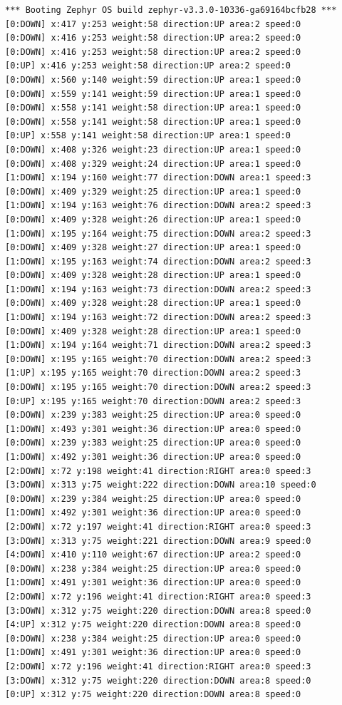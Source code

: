 \documentclass[11pt,a4paper,oneside]{article}
\begin{document}
\begin{lstlisting}
*** Booting Zephyr OS build zephyr-v3.3.0-10336-ga69164bcfb28 ***
[0:DOWN] x:417 y:253 weight:58 direction:UP area:2 speed:0
[0:DOWN] x:416 y:253 weight:58 direction:UP area:2 speed:0
[0:DOWN] x:416 y:253 weight:58 direction:UP area:2 speed:0
[0:UP] x:416 y:253 weight:58 direction:UP area:2 speed:0
[0:DOWN] x:560 y:140 weight:59 direction:UP area:1 speed:0
[0:DOWN] x:559 y:141 weight:59 direction:UP area:1 speed:0
[0:DOWN] x:558 y:141 weight:58 direction:UP area:1 speed:0
[0:DOWN] x:558 y:141 weight:58 direction:UP area:1 speed:0
[0:UP] x:558 y:141 weight:58 direction:UP area:1 speed:0
[0:DOWN] x:408 y:326 weight:23 direction:UP area:1 speed:0
[0:DOWN] x:408 y:329 weight:24 direction:UP area:1 speed:0
[1:DOWN] x:194 y:160 weight:77 direction:DOWN area:1 speed:3
[0:DOWN] x:409 y:329 weight:25 direction:UP area:1 speed:0
[1:DOWN] x:194 y:163 weight:76 direction:DOWN area:2 speed:3
[0:DOWN] x:409 y:328 weight:26 direction:UP area:1 speed:0
[1:DOWN] x:195 y:164 weight:75 direction:DOWN area:2 speed:3
[0:DOWN] x:409 y:328 weight:27 direction:UP area:1 speed:0
[1:DOWN] x:195 y:163 weight:74 direction:DOWN area:2 speed:3
[0:DOWN] x:409 y:328 weight:28 direction:UP area:1 speed:0
[1:DOWN] x:194 y:163 weight:73 direction:DOWN area:2 speed:3
[0:DOWN] x:409 y:328 weight:28 direction:UP area:1 speed:0
[1:DOWN] x:194 y:163 weight:72 direction:DOWN area:2 speed:3
[0:DOWN] x:409 y:328 weight:28 direction:UP area:1 speed:0
[1:DOWN] x:194 y:164 weight:71 direction:DOWN area:2 speed:3
[0:DOWN] x:195 y:165 weight:70 direction:DOWN area:2 speed:3
[1:UP] x:195 y:165 weight:70 direction:DOWN area:2 speed:3
[0:DOWN] x:195 y:165 weight:70 direction:DOWN area:2 speed:3
[0:UP] x:195 y:165 weight:70 direction:DOWN area:2 speed:3
[0:DOWN] x:239 y:383 weight:25 direction:UP area:0 speed:0
[1:DOWN] x:493 y:301 weight:36 direction:UP area:0 speed:0
[0:DOWN] x:239 y:383 weight:25 direction:UP area:0 speed:0
[1:DOWN] x:492 y:301 weight:36 direction:UP area:0 speed:0
[2:DOWN] x:72 y:198 weight:41 direction:RIGHT area:0 speed:3
[3:DOWN] x:313 y:75 weight:222 direction:DOWN area:10 speed:0
[0:DOWN] x:239 y:384 weight:25 direction:UP area:0 speed:0
[1:DOWN] x:492 y:301 weight:36 direction:UP area:0 speed:0
[2:DOWN] x:72 y:197 weight:41 direction:RIGHT area:0 speed:3
[3:DOWN] x:313 y:75 weight:221 direction:DOWN area:9 speed:0
[4:DOWN] x:410 y:110 weight:67 direction:UP area:2 speed:0
[0:DOWN] x:238 y:384 weight:25 direction:UP area:0 speed:0
[1:DOWN] x:491 y:301 weight:36 direction:UP area:0 speed:0
[2:DOWN] x:72 y:196 weight:41 direction:RIGHT area:0 speed:3
[3:DOWN] x:312 y:75 weight:220 direction:DOWN area:8 speed:0
[4:UP] x:312 y:75 weight:220 direction:DOWN area:8 speed:0
[0:DOWN] x:238 y:384 weight:25 direction:UP area:0 speed:0
[1:DOWN] x:491 y:301 weight:36 direction:UP area:0 speed:0
[2:DOWN] x:72 y:196 weight:41 direction:RIGHT area:0 speed:3
[3:DOWN] x:312 y:75 weight:220 direction:DOWN area:8 speed:0
[0:UP] x:312 y:75 weight:220 direction:DOWN area:8 speed:0
\end{lstlisting}
\end{document}
